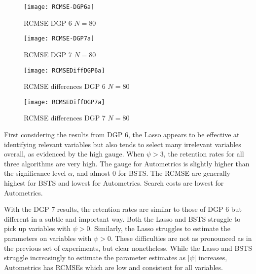 \begin{figure}[h]

\begin{minipage}{.5\textwidth}
\centering
\texttt{[image: RCMSE-DGP6a]}
\caption{RCMSE DGP 6 \newline $N=80$}
\label{fig:CMSEDGP6a}
\end{minipage}%
\begin{minipage}{.5\textwidth}
\centering
\texttt{[image: RCMSE-DGP7a]}
\caption{RCMSE DGP 7 \newline $N=80$}
\label{fig:CMSEDGP7a}

\end{minipage}

\end{figure}




\begin{figure}[h]

\begin{minipage}{.5\textwidth}
\centering
\texttt{[image: RCMSEDiffDGP6a]}
\caption{RCMSE differences DGP 6 \newline $N=80$}
\label{fig:CMSEDGP6a}
\end{minipage}%
\begin{minipage}{.5\textwidth}
\centering
\texttt{[image: RCMSEDiffDGP7a]}
\caption{RCMSE differences DGP 7 \newline $N=80$}
\label{fig:CMSEDGP7a}

\end{minipage}

\end{figure}

\clearpage

First considering the results from DGP 6, the Lasso appears to be effective at identifying relevant variables but also tends to select many irrelevant variables overall, as evidenced by the high gauge. When $\psi>3$, the retention rates for all three algorithms are very high. The gauge for Autometrics is slightly higher than the significance level $\alpha$, and almost 0 for BSTS. The RCMSE are generally highest for BSTS and lowest for Autometrics. Search costs are lowest for Autometrics. 

With the DGP 7 results, the retention rates are similar to those of DGP 6 but different in a subtle and important way. Both the Lasso and BSTS struggle to pick up variables with $\psi>0$. Similarly, the Lasso struggles to estimate the parameters on variables with $\psi>0$. These difficulties are not as pronounced as in the previous set of experiments, but clear nonetheless. While the Lasso and BSTS struggle increasingly to estimate the parameter estimates as $|\psi|$ increases, Autometrics has RCMSEs which are low and consistent for all variables. 

